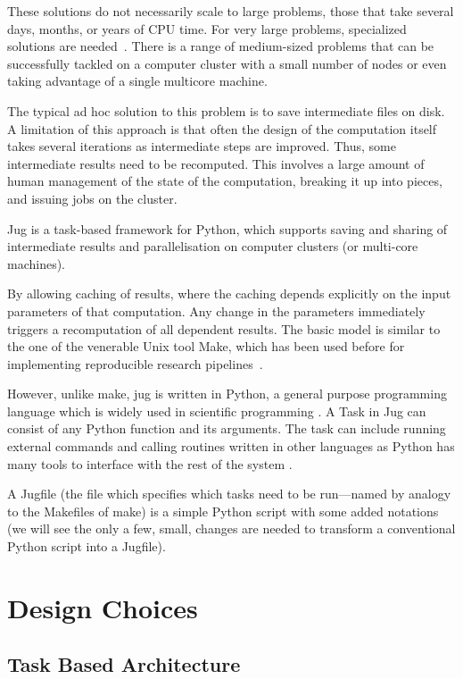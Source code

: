 \documentclass{article}
\begin{document}
These solutions do not necessarily scale to large problems, those that take
several days, months, or years of CPU time. For very large problems,
specialized solutions are needed~\citep{dean2008mapreduce,zaharia2010spark}.
There is a range of medium-sized problems that can be successfully tackled on a
computer cluster with a small number of nodes or even taking advantage of a
single multicore machine.

The typical ad hoc solution to this problem is to save intermediate files on
disk. A limitation of this approach is that often the design of the computation
itself takes several iterations as intermediate steps are improved. Thus, some
intermediate results need to be recomputed. This involves a large amount of
human management of the state of the computation, breaking it up into pieces,
and issuing jobs on the cluster.

Jug is a task-based framework for Python, which supports saving and sharing of
intermediate results and parallelisation on computer clusters (or multi-core
machines).

By allowing caching of results, where the caching depends explicitly on the
input parameters of that computation. Any change in the parameters immediately
triggers a recomputation of all dependent results. The basic model is similar
to the one of the venerable Unix tool Make, which has been used before for
implementing reproducible research pipelines~\citep{Schwab00makingscientific}.

However, unlike make, jug is written in Python, a general purpose programming
language which is widely used in scientific programming \citep{prabhu2011a}.  A
Task in Jug can consist of any Python function and its arguments. The task can
include running external commands and calling routines written in other
languages as Python has many tools to interface with the rest of the system
\citep{beazley1996swig,beazley2003automated,behnel2011cython}.

A Jugfile (the file which specifies which tasks need to be run---named by
analogy to the Makefiles of make) is a simple Python script with some added
notations (we will see the only a few, small, changes are needed to transform a
conventional Python script into a Jugfile).

\section{Design Choices}
\subsection{Task Based Architecture}
\end{document}
